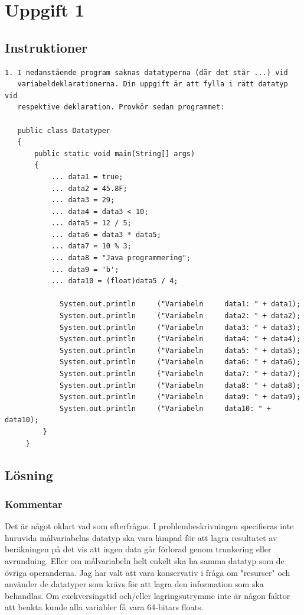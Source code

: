 \section{Uppgift 1}\label{uppgift-1}

\subsection{Instruktioner}
\begin{verbatim}
1. I nedanstående program saknas datatyperna (där det står ...) vid
   variabeldeklarationerna. Din uppgift är att fylla i rätt datatyp vid
   respektive deklaration. Provkör sedan programmet:

   public class Datatyper
   {
       public static void main(String[] args)
       {
           ... data1 = true;
           ... data2 = 45.8F;
           ... data3 = 29;
           ... data4 = data3 < 10;
           ... data5 = 12 / 5;
           ... data6 = data3 * data5;
           ... data7 = 10 % 3;
           ... data8 = "Java programmering";
           ... data9 = 'b';
           ... data10 = (float)data5 / 4;

             System.out.println     ("Variabeln     data1: " + data1);
             System.out.println     ("Variabeln     data2: " + data2);
             System.out.println     ("Variabeln     data3: " + data3);
             System.out.println     ("Variabeln     data4: " + data4);
             System.out.println     ("Variabeln     data5: " + data5);
             System.out.println     ("Variabeln     data6: " + data6);
             System.out.println     ("Variabeln     data7: " + data7);
             System.out.println     ("Variabeln     data8: " + data8);
             System.out.println     ("Variabeln     data9: " + data9);
             System.out.println     ("Variabeln     data10: " + data10);
         }
     }
\end{verbatim}

\subsection{Lösning}
\subsubsection{Kommentar}
Det är något oklart vad som efterfrågas. I problembeskrivningen specifieras
inte huruvida målvariabelns datatyp ska vara lämpad för att lagra resultatet av
beräkningen på det vis att ingen data går förlorad genom trunkering eller
avrundning.  Eller om målvariabeln helt enkelt ska ha samma datatyp som de
övriga operanderna. Jag har valt att vara konservativ i fråga om "resurser" 
och använder de datatyper som krävs för att lagra den information som ska
behandlas. Om exekversingstid och/eller lagringsutrymme inte är någon faktor att
beakta kunde alla variabler få vara 64-bitars floats.

